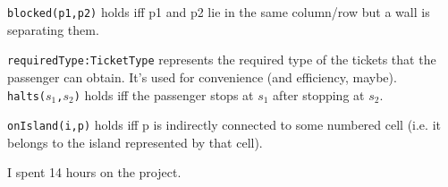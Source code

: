 

\texttt{blocked(p1,p2)} holds iff p1 and p2 lie in the same column/row but a wall is separating them.


\texttt{requiredType:TicketType} represents the required type of the tickets that the passenger can obtain. It's used for convenience (and efficiency, maybe).\\
\texttt{halts($s_1$,$s_2$)} holds iff the passenger stops at $s_1$ after stopping at $s_2$.


\texttt{onIsland(i,p)} holds iff p is indirectly connected to some numbered cell (i.e. it belongs to the island represented by that cell).


I spent 14 hours on the project.